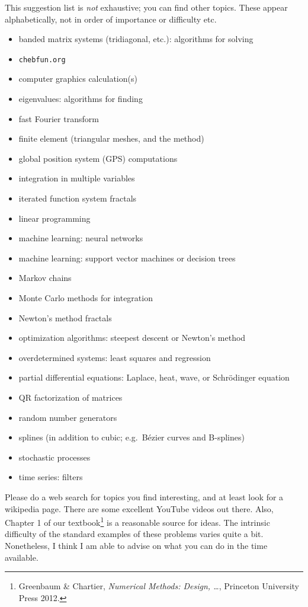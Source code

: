 \documentclass[11pt]{amsart}
\begin{document}
This suggestion list is \emph{not} exhaustive; you can find other topics.  These appear alphabetically, not in order of importance or difficulty etc.
\begin{itemize}
\item banded matrix systems (tridiagonal, etc.): algorithms for solving
\item \texttt{chebfun.org}
\item computer graphics calculation(s)
\item eigenvalues: algorithms for finding
\item fast Fourier transform
\item finite element (triangular meshes, and the method)
\item global position system (GPS) computations
\item integration in multiple variables
\item iterated function system fractals
\item linear programming
\item machine learning: neural networks
\item machine learning: support vector machines or decision trees
\item Markov chains
\item Monte Carlo methods for integration
\item Newton's method fractals
\item optimization algorithms: steepest descent or Newton's method
\item overdetermined systems: least squares and regression
\item partial differential equations: Laplace, heat, wave, or Schr\"odinger equation
\item QR factorization of matrices
\item random number generators
\item splines (in addition to cubic; e.g.~B\'ezier curves and B-splines)
\item stochastic processes
\item time series: filters
\end{itemize}

\medskip \noindent Please do a web search for topics you find interesting, and at least look for a wikipedia page.  There are some excellent YouTube videos out there.  Also, Chapter 1 of our textbook\footnote{Greenbaum \& Chartier, \emph{Numerical Methods: Design, \dots}, Princeton University Press 2012.} is a reasonable source for ideas.  The intrinsic difficulty of the standard examples of these problems varies quite a bit. Nonetheless, I think I am able to advise on what you can do in the time available.
\end{document}
